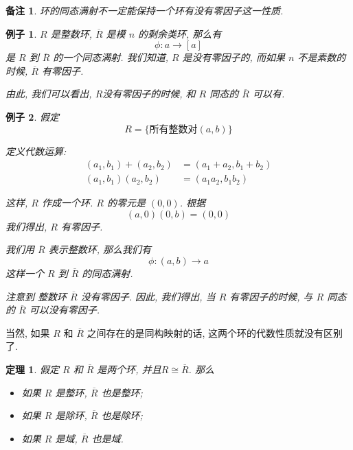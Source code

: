 \documentclass[utf8]{ctexbook}
\newtheorem{theorem}{定理}[section]
\newtheorem{memo}{备注}[section]
\newtheorem{example}{例子}[section]
\begin{document}
\begin{memo}
环的同态满射不一定能保持一个环有没有零因子这一性质.
\end{memo}

\begin{example}
$R$ 是整数环, $\overline{R}$ 是模 $n$ 的剩余类环, 那么有
\begin{equation}
\phi: a \rightarrow [a]
\end{equation}
是 $R$ 到 $\overline{R}$ 的一个同态满射. 我们知道, $R$ 是没有零因子的, 而如果 $n$ 不是素数的时候, $\overline{R}$ 有零因子.

由此, 我们可以看出, $R$没有零因子的时候, 和 $R$ 同态的 $\overline{R}$ 可以有.

\end{example}

\begin{example}
假定
\begin{equation}
R = \{  \mbox{所有整数对} (a,b) \}
\end{equation}

定义代数运算:
\begin{align*}
 (a_1 , b_1 ) + (a_2, b_2) &= (a_1 + a_2, b_1 + b_2) \\
 (a_1, b_1) (a_2, b_2) &= (a_1 a_2, b_1 b_2)
\end{align*}

这样, $R$ 作成一个环. $R$ 的零元是 $(0,0)$. 根据
\begin{equation}
(a,0)(0,b) = (0,0)
\end{equation}
我们得出, $R$ 有零因子.


我们用 $\overline{R}$ 表示整数环, 那么我们有
\begin{equation}
\phi: (a,b) \longrightarrow a
\end{equation}
这样一个 $R$ 到 $\overline{R}$ 的同态满射. 

注意到 整数环 $\overline{R}$ 没有零因子. 因此, 我们得出, 当 $R$ 有零因子的时候, 与 $R$ 同态的 $\overline{R}$ 可以没有零因子.


\end{example}

当然, 如果 $R$ 和 $\overline{R}$ 之间存在的是同构映射的话, 这两个环的代数性质就没有区别了.

\begin{theorem}
假定 $R$ 和 $\overline{R}$ 是两个环, 并且$ R \cong \overline{R} $. 那么
\begin{itemize}
\item{如果 $R$ 是整环, $\overline{R}$ 也是整环;}
\item{如果 $R$ 是除环, $\overline{R}$ 也是除环;}
\item{如果 $R$ 是域, $\overline{R}$ 也是域.}
\end{itemize}
\end{theorem}
\end{document}
